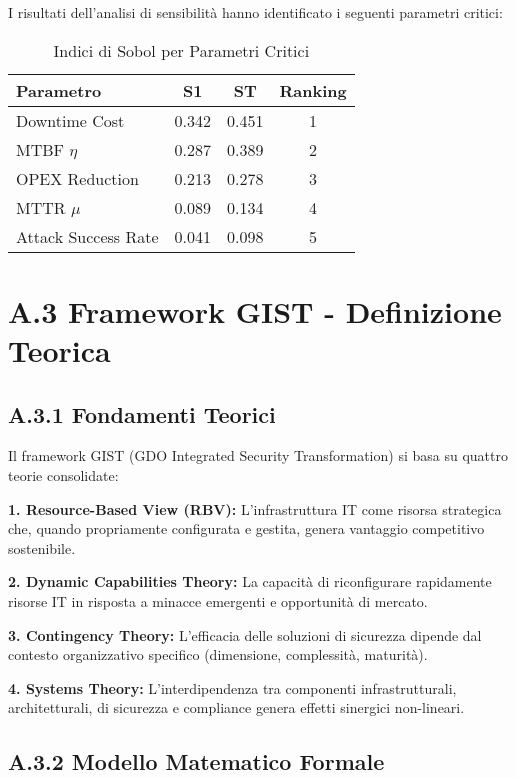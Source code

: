 I risultati dell'analisi di sensibilità hanno identificato i seguenti parametri critici:

\begin{table}[htbp]
\centering
\caption{Indici di Sobol per Parametri Critici}
\label{tab:sobol_indices}
\begin{tabular}{lccc}
\toprule
\textbf{Parametro} & \textbf{S1} & \textbf{ST} & \textbf{Ranking} \\
\midrule
Downtime Cost & 0.342 & 0.451 & 1 \\
MTBF $\eta$ & 0.287 & 0.389 & 2 \\
OPEX Reduction & 0.213 & 0.278 & 3 \\
MTTR $\mu$ & 0.089 & 0.134 & 4 \\
Attack Success Rate & 0.041 & 0.098 & 5 \\
\bottomrule
\end{tabular}
\end{table}

\section{A.3 Framework GIST - Definizione Teorica}

\subsection{A.3.1 Fondamenti Teorici}

Il framework GIST (GDO Integrated Security Transformation) si basa su quattro teorie consolidate:

\textbf{1. Resource-Based View (RBV):} L'infrastruttura IT come risorsa strategica che, quando propriamente configurata e gestita, genera vantaggio competitivo sostenibile.

\textbf{2. Dynamic Capabilities Theory:} La capacità di riconfigurare rapidamente risorse IT in risposta a minacce emergenti e opportunità di mercato.

\textbf{3. Contingency Theory:} L'efficacia delle soluzioni di sicurezza dipende dal contesto organizzativo specifico (dimensione, complessità, maturità).

\textbf{4. Systems Theory:} L'interdipendenza tra componenti infrastrutturali, architetturali, di sicurezza e compliance genera effetti sinergici non-lineari.

\subsection{A.3.2 Modello Matematico Formale}

